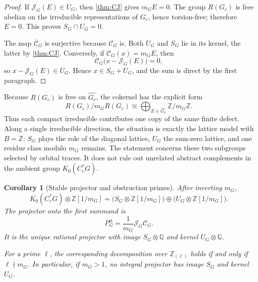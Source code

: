 \documentclass[11pt]{amsart}
\newtheorem{corollary}[theorem]{Corollary}
\theoremstyle{definition}
\theoremstyle{remark}
\newcommand{\Z}{\mathbb Z}
\newcommand{\Q}{\mathbb Q}
\newcommand{\Cr}{C_r^*}
\newcommand{\st}{\mathrm{st}}
\begin{document}
\begin{proof}
If $\mathcal J_G(E)\in U_G$, then \cref{thm:CJ} gives $m_GE=0$.  The group $R(G_c)$ is free abelian on the irreducible representations of $G_c$, hence torsion-free; therefore $E=0$.  This proves $S_G\cap U_G=0$.

The map $\overline{\mathcal C}_G$ is surjective because $\mathcal C_G$ is.  Both $U_G$ and $S_G$ lie in its kernel, the latter by \cref{thm:CJ}.  Conversely, if $\mathcal C_G(x)=m_GE$, then
\[
  \mathcal C_G\bigl(x-\mathcal J_G(E)\bigr)=0,
\]
so $x-\mathcal J_G(E)\in U_G$.  Hence $x\in S_G+U_G$, and the sum is direct by the first paragraph.
\end{proof}

Because $R(G_c)$ is free on $\widehat{G_c}$, the cokernel has the explicit form
\begin{equation}\label{eq:defect-direct-sum}
  R(G_c)/m_GR(G_c)
  \cong\bigoplus_{E\in\widehat{G_c}}\Z/m_G\Z.
\end{equation}
Thus each compact irreducible contributes one copy of the same finite defect.  Along a single irreducible direction, the situation is exactly the lattice model with \(B=\mathbb Z\): \(S_G\) plays the role of the diagonal lattice, \(U_G\) the sum-zero lattice, and one residue class modulo \(m_G\) remains.  The statement concerns these two subgroups selected by orbital traces.  It does not rule out unrelated abstract complements in the ambient group \(K_0(\Cr G)\).

\begin{corollary}[Stable projector and obstruction primes]\label{cor:projector}
After inverting $m_G$,
\begin{equation}\label{eq:localized-splitting}
  K_0(\Cr G)\otimes\Z[1/m_G]
  =\bigl(S_G\otimes\Z[1/m_G]\bigr)
   \oplus
   \bigl(U_G\otimes\Z[1/m_G]\bigr).
\end{equation}
The projector onto the first summand is
\begin{equation}\label{eq:stable-projector}
  P_G^{\st}=\frac1{m_G}\mathcal J_G\mathcal C_G.
\end{equation}
It is the unique rational projector with image $S_G\otimes\Q$ and kernel $U_G\otimes\Q$.

For a prime $\ell$, the corresponding decomposition over $\Z_{(\ell)}$ holds if and only if $\ell\nmid m_G$.  In particular, if $m_G>1$, no integral projector has image $S_G$ and kernel $U_G$.
\end{corollary}
\end{document}
